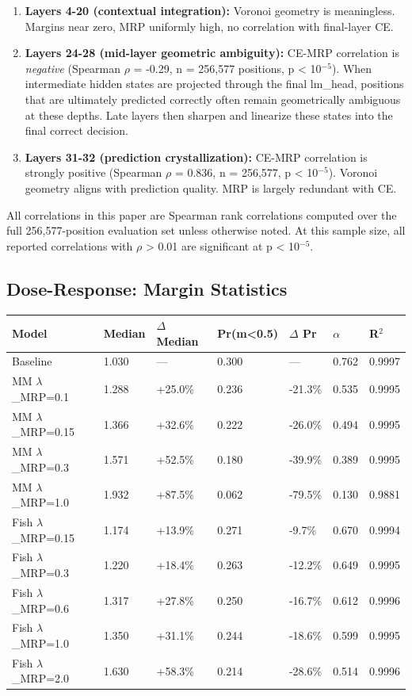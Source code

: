 \documentclass[
  11pt,
]{article}
\begin{document}
\begin{enumerate}
\def\labelenumi{\arabic{enumi}.}
\item
  \textbf{Layers 4-20 (contextual integration):} Voronoi geometry is
  meaningless. Margins near zero, MRP uniformly high, no correlation
  with final-layer CE.
\item
  \textbf{Layers 24-28 (mid-layer geometric ambiguity):} CE-MRP
  correlation is \emph{negative} (Spearman $\rho$ = -0.29, n = 256,577
  positions, p \textless{} 10$^{-5}$). When intermediate hidden states are
  projected through the final lm\_head, positions that are ultimately
  predicted correctly often remain geometrically ambiguous at these
  depths. Late layers then sharpen and linearize these states into the
  final correct decision.
\item
  \textbf{Layers 31-32 (prediction crystallization):} CE-MRP correlation
  is strongly positive (Spearman $\rho$ = 0.836, n = 256,577, p \textless{}
  10$^{-5}$). Voronoi geometry aligns with prediction quality. MRP is largely
  redundant with CE.
\end{enumerate}

All correlations in this paper are Spearman rank correlations computed
over the full 256,577-position evaluation set unless otherwise noted. At
this sample size, all reported correlations with \textbar $\rho$\textbar{}
\textgreater{} 0.01 are significant at p \textless{} 10$^{-5}$.

\hypertarget{dose-response-margin-statistics}{%
\subsection{Dose-Response: Margin
Statistics}\label{dose-response-margin-statistics}}

\begin{longtable}[]{@{}lllllll@{}}
\toprule\noalign{}
Model & Median & $\Delta$ Median & Pr(m\textless0.5) & $\Delta$ Pr & $\alpha$ & R$^2$ \\
\midrule\noalign{}
\endhead
\bottomrule\noalign{}
\endlastfoot
Baseline & 1.030 & --- & 0.300 & --- & 0.762 & 0.9997 \\
MM $\lambda$\_MRP=0.1 & 1.288 & +25.0\% & 0.236 & -21.3\% & 0.535 & 0.9995 \\
MM $\lambda$\_MRP=0.15 & 1.366 & +32.6\% & 0.222 & -26.0\% & 0.494 & 0.9995 \\
MM $\lambda$\_MRP=0.3 & 1.571 & +52.5\% & 0.180 & -39.9\% & 0.389 & 0.9995 \\
MM $\lambda$\_MRP=1.0 & 1.932 & +87.5\% & 0.062 & -79.5\% & 0.130 & 0.9881 \\
Fish $\lambda$\_MRP=0.15 & 1.174 & +13.9\% & 0.271 & -9.7\% & 0.670 & 0.9994 \\
Fish $\lambda$\_MRP=0.3 & 1.220 & +18.4\% & 0.263 & -12.2\% & 0.649 & 0.9995 \\
Fish $\lambda$\_MRP=0.6 & 1.317 & +27.8\% & 0.250 & -16.7\% & 0.612 & 0.9996 \\
Fish $\lambda$\_MRP=1.0 & 1.350 & +31.1\% & 0.244 & -18.6\% & 0.599 & 0.9995 \\
Fish $\lambda$\_MRP=2.0 & 1.630 & +58.3\% & 0.214 & -28.6\% & 0.514 & 0.9996 \\
\end{longtable}
\end{document}
